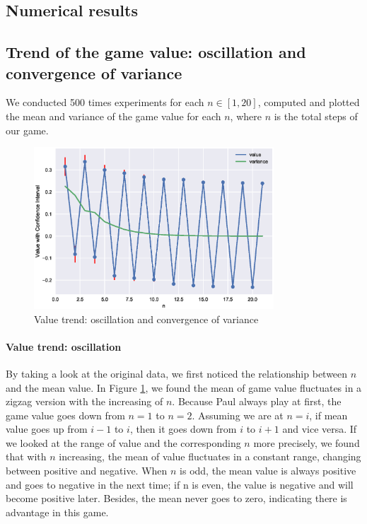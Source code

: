\documentclass[a4paper,english]{article}
\begin{document}
\begin{spacing}{1.4}
\section{Numerical results}
\subsection{Trend of the game value: oscillation and convergence of variance}
We conducted 500 times experiments for each $n \in [1,20]$, computed and plotted the mean and variance of the game value for each $n$, where $n$ is the total steps of our game.

\begin{figure}[htb!]
\centering
\includegraphics[width=0.8\textwidth]{figures/plot1.eps}
\caption{Value trend: oscillation and convergence of variance}
\label{oscillate}
\end{figure}

\paragraph{Value trend: oscillation}
By taking a look at the original data, we first noticed the relationship between $n$ and the mean value. In Figure \ref{oscillate}, we found the mean of game value fluctuates in a zigzag version with the increasing of $n$. Because Paul always play at first, the game value goes down from $n=1$ to $n=2$. Assuming we are at $n=i$, if mean value goes up from $i-1$ to $i$, then it goes down from $i$ to $i+1$ and vice versa. If we looked at the range of value and the corresponding $n$ more precisely, we found that with $n$ increasing, the mean of value fluctuates in a constant range, changing between positive and negative. When $n$ is odd, the mean value is always positive and goes to negative in the next time; if n is even, the value is negative and will become positive later. Besides, the mean never goes to zero, indicating there is advantage in this game.

\end{spacing}
\end{document}
